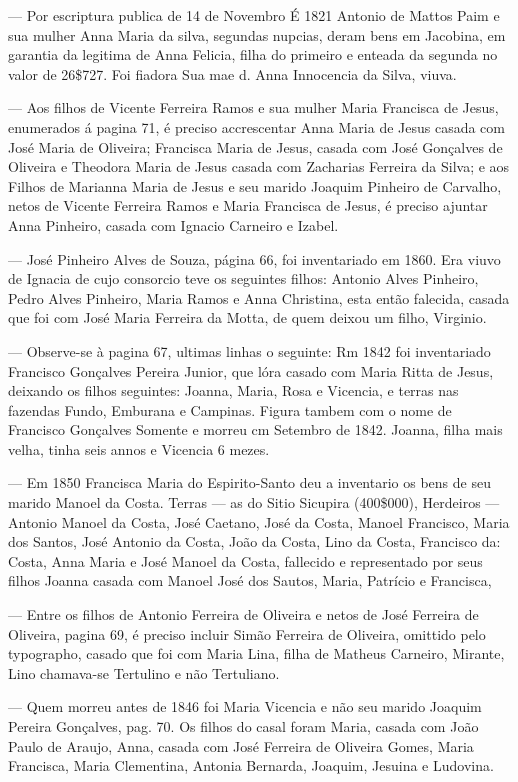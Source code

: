 — Por escriptura publica de 14 de Novembro É 1821 Antonio de Mattos Paim e sua mulher Anna Maria da silva, segundas nupcias, deram bens em Jacobina, em garantia da legitima de Anna Felicia, filha do primeiro e enteada da segunda no valor de 26\$727. Foi fiadora Sua mae d. Anna Innocencia da Silva, viuva.

— Aos filhos de Vicente Ferreira Ramos e sua mulher Maria Francisca de Jesus, enumerados á pagina 71, é preciso accrescentar Anna Maria de Jesus casada com José Maria de Oliveira; Francisca Maria de Jesus, casada com José Gonçalves de Oliveira e Theodora Maria de Jesus casada com Zacharias Ferreira da Silva; e aos Filhos de Marianna Maria de Jesus e seu marido Joaquim Pinheiro de Carvalho, netos de Vicente Ferreira Ramos e Maria Francisca de Jesus, é preciso ajuntar Anna Pinheiro, casada com Ignacio Carneiro e Izabel.

— José Pinheiro Alves de Souza, página 66, foi inventariado em 1860. Era viuvo de Ignacia de cujo consorcio teve os seguintes filhos: Antonio Alves Pinheiro, Pedro Alves Pinheiro, Maria Ramos e Anna Christina, esta então falecida, casada que foi com José Maria Ferreira da Motta, de quem deixou um filho, Virginio.

— Observe-se à pagina 67, ultimas linhas o seguinte:
Rm 1842 foi inventariado Francisco Gonçalves Pereira Junior, que lóra casado com Maria Ritta de Jesus, deixando os filhos seguintes: Joanna, Maria, Rosa e Vicencia, e terras nas fazendas Fundo, Emburana e Campinas. Figura tambem com o nome de Francisco Gonçalves Somente e morreu cm Setembro de 1842. Joanna, filha mais velha, tinha seis annos e Vicencia 6 mezes.

— Em 1850 Francisca Maria do Espirito-Santo deu a inventario os bens de seu marido Manoel da Costa.
Terras — as do Sitio Sicupira (400\$000),
Herdeiros — Antonio Manoel da Costa, José Caetano, José da Costa, Manoel Francisco, Maria dos Santos, José Antonio da Costa, João da Costa, Lino da Costa, Francisco da: Costa, Anna Maria e José Manoel da Costa, fallecido e representado por seus filhos Joanna casada com Manoel José dos Sautos, Maria, Patrício e Francisca,

— Entre os filhos de Antonio Ferreira de Oliveira e netos de José Ferreira de Oliveira, pagina 69, é preciso incluir Simão Ferreira de Oliveira, omittido pelo typographo, casado que foi com Maria Lina, filha de Matheus Carneiro, Mirante, Lino chamava-se Tertulino e não Tertuliano.

— Quem morreu antes de 1846 foi Maria Vicencia e não seu marido Joaquim Pereira Gonçalves, pag. 70.
Os filhos do casal foram Maria, casada com João Paulo de Araujo, Anna, casada com José Ferreira de Oliveira Gomes, Maria Francisca, Maria Clementina, Antonia Bernarda, Joaquim, Jesuina e Ludovina.

